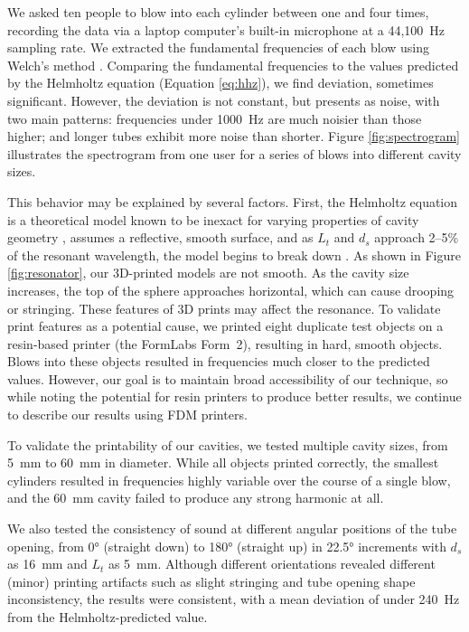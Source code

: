       We asked ten people to blow into each cylinder between one and four times,
      recording the data via a laptop computer's built-in microphone at a
      44,100~Hz sampling rate. We extracted the fundamental frequencies of each
      blow using Welch's method \cite{Welch:1967jw}. Comparing the fundamental
      frequencies to the values predicted by the Helmholtz equation (Equation
      \ref{eq:hhz}), we find deviation, sometimes significant. However, the
      deviation is not constant, but presents as noise, with two main patterns:
      frequencies under 1000~Hz are much noisier than those higher; and longer
      tubes exhibit more noise than shorter. Figure \ref{fig:spectrogram}
      illustrates the spectrogram from one user for a series of blows into
      different cavity sizes.

      This behavior may be explained by several factors. First, the Helmholtz
      equation is a theoretical model known to be inexact for varying properties
      of cavity geometry \cite{Selamet:1995kv, Alster:1972ha}, assumes a
      reflective, smooth surface, and  as $L_t$ and $d_s$ approach 2--5\% of the
      resonant wavelength, the model begins to break down \cite{Selamet:1995kv}.
      As shown in Figure \ref{fig:resonator}, our 3D-printed models are not
      smooth. As the cavity size increases, the top of the sphere approaches
      horizontal, which can cause drooping or stringing. These features of 3D
      prints may affect the resonance. To validate print features as a potential
      cause, we printed eight duplicate test objects on a resin-based printer
      (the FormLabs Form~2), resulting in hard, smooth objects. Blows into these
      objects resulted in frequencies much closer to the predicted values.
      However, our goal is to maintain broad accessibility of our technique, so
      while noting the potential for resin printers to produce better results,
      we continue to describe our results using FDM printers.
      
      To validate the printability of our cavities, we tested multiple cavity
      sizes, from 5~mm to 60~mm in diameter. While all objects printed
      correctly, the smallest cylinders resulted in frequencies highly variable
      over the course of a single blow, and the 60~mm cavity failed to produce
      any strong harmonic at all.
      
      We also tested the consistency of sound at different angular positions of
      the tube opening, from 0° (straight down) to 180° (straight up) in 22.5°
      increments with $d_s$ as 16~mm and $L_t$ as 5~mm.  Although different
      orientations revealed different (minor) printing artifacts such as slight
      stringing and tube opening shape inconsistency, the results were
      consistent, with a mean deviation of under 240~Hz from the
      Helmholtz-predicted value.
      

